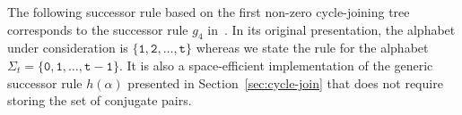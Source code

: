 \documentclass[US-letter,USenglish,authorcolumns,autoref]{lipics-v2021}
\renewcommand{\tt} {\mathtt}
\begin{document}

The following successor rule based on the first non-zero cycle-joining tree corresponds to the successor rule $g_4$ in~\cite{karyframework}. In  its original presentation, the alphabet under consideration is $\{\tt{1,2, \ldots ,t}\}$ whereas we state the rule for the alphabet $\Sigma_t = \{\tt{0,1, \ldots ,t{-}1}\}$.
It is also a space-efficient implementation of the generic successor rule $h(\alpha)$ presented in Section~\ref{sec:cycle-join} that does not require storing the set of conjugate pairs.
\end{document}
